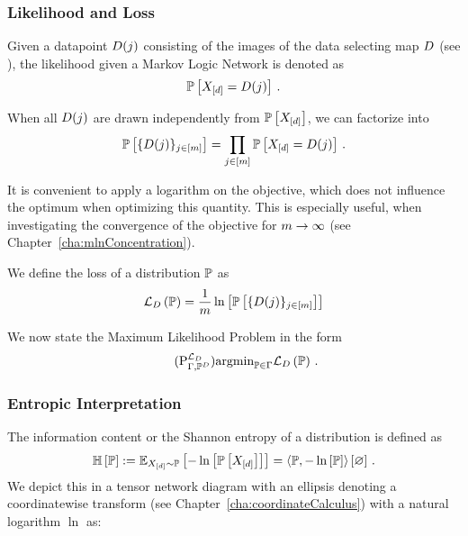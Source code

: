 \subsubsection{Likelihood and Loss}

Given a datapoint $D(j)$ consisting of the images of the data selecting map $D$ (see ), the likelihood given a Markov Logic Network is denoted as
	\[ \mathbb{P}\left[X_{[d]} = D(j)\right] \, . \]
	
When all $D(j)$ are drawn independently from $\mathbb{P}\left[X_{[d]}\right]$, we can factorize into
	\[ \mathbb{P}\left[\{D(j)\}_{j\in[m]}\right]  = \prod_{j\in[m]} \mathbb{P}\left[X_{[d]}=D(j)\right] \, . \]

It is convenient to apply a logarithm on the objective, which does not influence the optimum when optimizing this quantity.
This is especially useful, when investigating the convergence of the objective for $m\rightarrow\infty$ (see Chapter~\ref{cha:mlnConcentration}).

\begin{definition}\label{def:loss}
	We define the loss of a distribution $\mathbb{P}$ as
	\begin{align*}%
		\lossof{\probtensor} 
		= \frac{1}{\datanum} \lnof{\probof{\data}} 
	\end{align*}
\end{definition}

We now state the Maximum Likelihood Problem in the form
\begin{align}\tag{$\probtagtypeinst{\loss}{\Gamma,\empdistribution}$}\label{prob:parameterMaxLikelihood}
	\argmin_{\probtensor\in\Gamma} \lossof{\probtensor} \, . %
\end{align}



\subsubsection{Entropic Interpretation}



\begin{definition}
	The information content or the Shannon entropy of a distribution is defined as
		\[ \mathbb{H}\left[\mathbb{P}\right] 
		:= \mathbb{E}_{X_{[d]}\sim\mathbb{P}}\left[-\ln \left[ \mathbb{P}\left[X_{[d]}\right] \right]\right] 
		= \left\langle \mathbb{P},-\ln \left[ \mathbb{P} \right]\right\rangle \left[ \varnothing \right] \, . \]
	We depict this in a tensor network diagram with an ellipsis denoting a coordinatewise transform (see Chapter~\ref{cha:coordinateCalculus}) with a natural logarithm $\ln$ as:
	\begin{center}
		
	\end{center}
\end{definition}


